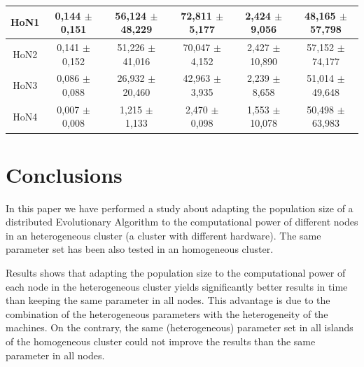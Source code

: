 \documentclass[final,1p,times]{elsarticle}
\begin{document}
\begin{table}[htb]
{\begin{tabular}{|c|c|c|c|c|c|}
HoN1 &   0,144 $\pm$  0,151 &  56,124 $\pm$ 48,229 & 72,811 $\pm$ 5,177  & 2,424 $\pm$  9,056  & 48,165  $\pm$57,798 \\ \hline
HoN2 &   0,141 $\pm$  0,152 &  51,226 $\pm$ 41,016 & 70,047 $\pm$ 4,152  & 2,427 $\pm$  10,890 & 57,152  $\pm$74,177 \\ \hline
HoN3 &   0,086 $\pm$  0,088 &  26,932 $\pm$ 20,460 & 42,963 $\pm$ 3,935  & 2,239 $\pm$  8,658  & 51,014  $\pm$49,648 \\ \hline
HoN4 &   0,007 $\pm$  0,008 &  1,215  $\pm$ 1,133  & 2,470  $\pm$ 0,098  & 1,553 $\pm$  10,078 & 50,498 $\pm$ 63,983 \\ \hline
\end{tabular}
}
\label{tab:onemaxtimes}
\end{table}

\section{Conclusions}
In this paper we have performed a study about adapting the
population size of a distributed Evolutionary Algorithm to the computational
power of different nodes in an heterogeneous cluster (a cluster with different hardware).
The same parameter set has been also tested in an homogeneous cluster. 

Results shows that adapting the population size to the computational power of each node in the heterogeneous cluster yields significantly
better results in time than keeping the same parameter in all nodes. This advantage is due to the combination of the heterogeneous parameters with the heterogeneity of the machines. On the contrary, the same (heterogeneous) parameter set in all islands of the homogeneous cluster could not improve the results than the same parameter in all nodes.

\end{document}
